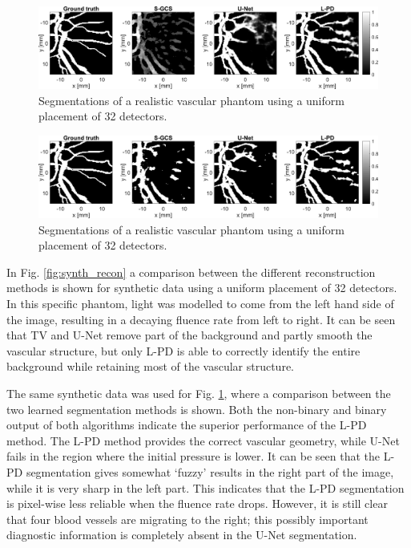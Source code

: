 \documentclass[journal]{IEEEtran}
\newcommand{\hl}[1]{\cbcolor{red}\begin{changebar}{#1}\end{changebar}}
\begin{document}
\hl{
\begin{figure}[ht!]
\centering
\includegraphics[width=0.8\linewidth]{images/paper_synthetic_segm.png}
\caption{Segmentations of a realistic vascular phantom using a uniform placement of 32 detectors.}
\label{fig:synth_segm}
\end{figure}
}

\hl{
\begin{figure}[ht!]
\centering
\includegraphics[width=0.8\linewidth]{images/paper_synthetic_segm_binary.png}
\caption{Segmentations of a realistic vascular phantom using a uniform placement of 32 detectors.}
\label{fig:synth_segm_binary}
\end{figure}
}

In Fig. \ref{fig:synth_recon} a comparison between the different reconstruction methods is shown for synthetic data using a uniform placement of 32 detectors. In this specific phantom, light was modelled to come from the left hand side of the image, resulting in a decaying fluence rate from left to right. It can be seen that TV and U-Net remove part of the background and partly smooth the vascular structure, but only L-PD is able to correctly identify the entire background while retaining most of the vascular structure. 

The same synthetic data was used for Fig. \ref{fig:synth_segm}, where a comparison between the two learned segmentation methods is shown. Both the non-binary and binary output of both algorithms indicate the superior performance of the L-PD method. The L-PD method provides the correct vascular geometry, while U-Net fails in the region where the initial pressure is lower. It can be seen that the L-PD segmentation gives somewhat `fuzzy' results in the right part of the image, while it is very sharp in the left part. This indicates that the L-PD segmentation is pixel-wise less reliable when the fluence rate drops. However, it is still clear that four blood vessels are migrating to the right; this possibly important diagnostic information is completely absent in the U-Net segmentation.
\end{document}
